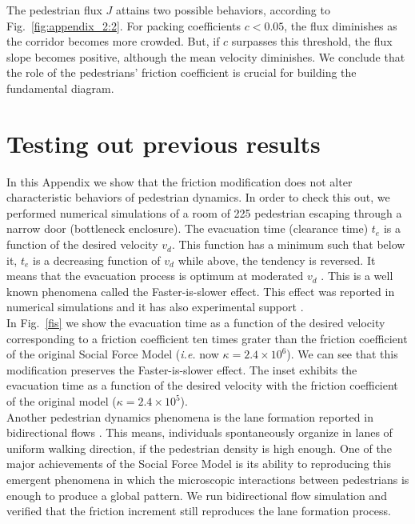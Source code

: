 The pedestrian flux $J$ attains two possible behaviors, according to 
Fig.~\ref{fig:appendix_2:2}. For packing coefficients $c<0.05$, the flux 
diminishes as the corridor becomes more crowded. But, if $c$ surpasses this 
threshold, the flux slope becomes positive, although the mean velocity 
diminishes. We conclude that the role of the pedestrians' friction coefficient is crucial 
for building the fundamental diagram.   


\section{\label{appendix_3} Testing out previous results}


In this Appendix we show that the friction modification does not alter characteristic behaviors of pedestrian dynamics. In order to check this out, we performed numerical simulations of a room of 225 pedestrian escaping through a narrow door (bottleneck enclosure). The evacuation time (clearance time) $t_e$ is a function of the desired velocity $v_d$. This function has a minimum such that below it, $t_e$ is a decreasing function of $v_d$ while above, the tendency is reversed. It means that the evacuation process is optimum at moderated $v_d$ . This is a well known phenomena called the Faster-is-slower effect. This effect was reported in numerical simulations \cite{Helbing1,Dorso5} and it has also experimental support \cite{parisi1}.\\

In Fig.~\ref{fis} we show the evacuation time as a function of the desired velocity corresponding to a friction coefficient ten times grater than the friction coefficient of the original Social Force Model (\textit{i.e.} now $\kappa=2.4\times 10^{6}$). We can see that this modification preserves the Faster-is-slower effect. The inset exhibits the evacuation time as a function of the desired velocity with the friction coefficient of the original model ($\kappa=2.4\times 10^{5}$).\\

Another pedestrian dynamics phenomena is the lane formation reported in bidirectional flows \cite{feliciani1,helbing5,guo1,qiao1}. This means, individuals spontaneously organize in lanes of uniform walking direction, if the pedestrian density is high enough. One of the major achievements of the Social Force Model is its ability to reproducing this emergent phenomena in which the microscopic interactions between pedestrians is enough to produce a global pattern. We run bidirectional flow simulation and verified that the friction increment still reproduces the lane formation process.\\  

